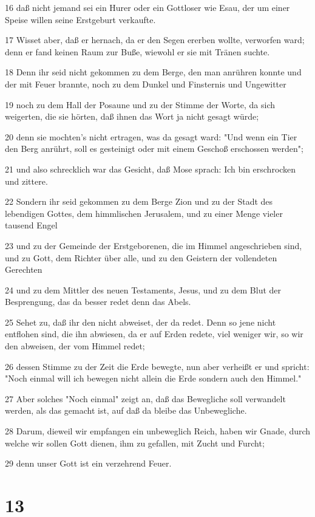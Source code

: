 \par 16 daß nicht jemand sei ein Hurer oder ein Gottloser wie Esau, der um einer Speise willen seine Erstgeburt verkaufte.
\par 17 Wisset aber, daß er hernach, da er den Segen ererben wollte, verworfen ward; denn er fand keinen Raum zur Buße, wiewohl er sie mit Tränen suchte.
\par 18 Denn ihr seid nicht gekommen zu dem Berge, den man anrühren konnte und der mit Feuer brannte, noch zu dem Dunkel und Finsternis und Ungewitter
\par 19 noch zu dem Hall der Posaune und zu der Stimme der Worte, da sich weigerten, die sie hörten, daß ihnen das Wort ja nicht gesagt würde;
\par 20 denn sie mochten's nicht ertragen, was da gesagt ward: "Und wenn ein Tier den Berg anrührt, soll es gesteinigt oder mit einem Geschoß erschossen werden";
\par 21 und also schrecklich war das Gesicht, daß Mose sprach: Ich bin erschrocken und zittere.
\par 22 Sondern ihr seid gekommen zu dem Berge Zion und zu der Stadt des lebendigen Gottes, dem himmlischen Jerusalem, und zu einer Menge vieler tausend Engel
\par 23 und zu der Gemeinde der Erstgeborenen, die im Himmel angeschrieben sind, und zu Gott, dem Richter über alle, und zu den Geistern der vollendeten Gerechten
\par 24 und zu dem Mittler des neuen Testaments, Jesus, und zu dem Blut der Besprengung, das da besser redet denn das Abels.
\par 25 Sehet zu, daß ihr den nicht abweiset, der da redet. Denn so jene nicht entflohen sind, die ihn abwiesen, da er auf Erden redete, viel weniger wir, so wir den abweisen, der vom Himmel redet;
\par 26 dessen Stimme zu der Zeit die Erde bewegte, nun aber verheißt er und spricht: "Noch einmal will ich bewegen nicht allein die Erde sondern auch den Himmel."
\par 27 Aber solches "Noch einmal" zeigt an, daß das Bewegliche soll verwandelt werden, als das gemacht ist, auf daß da bleibe das Unbewegliche.
\par 28 Darum, dieweil wir empfangen ein unbeweglich Reich, haben wir Gnade, durch welche wir sollen Gott dienen, ihm zu gefallen, mit Zucht und Furcht;
\par 29 denn unser Gott ist ein verzehrend Feuer.

\chapter{13}

